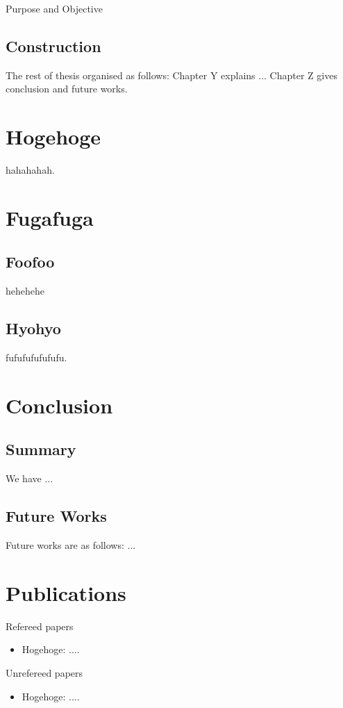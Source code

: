 \documentclass[12pt,epsf]{report}
\begin{document}
Purpose and Objective

\section{Construction}
The rest of thesis organised as follows:
Chapter Y explains ... 
Chapter Z gives conclusion and future works.


\chapter{Hogehoge}

hahahahah.

\chapter{Fugafuga}
\section{Foofoo}
hehehehe

\section{Hyohyo}

fufufufufufufu.

\chapter{Conclusion}
\section{Summary}

We have ...

\section{Future Works}

Future works are as follows: ...

\newpage

\chapter*{Publications}

\begin{list}%
 {} %
 {} %
 \item Refereed papers
       \begin{itemize}
	\item Hogehoge: ....
       \end{itemize}
 \item Unrefereed papers
       \begin{itemize}
	\item Hogehoge: ....
       \end{itemize}
\end{list}
\end{document}
